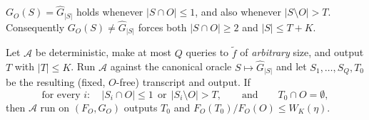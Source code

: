 \begin{lemma}
\label{lem:f3-window}
$G_O(S)=\hat G_{|S|}$ holds whenever $|S\cap O|\le1$, and also whenever
$|S\setminus O|>T$.  Consequently $G_O(S)\neq\hat G_{|S|}$ forces both
$|S\cap O|\ge2$ and $|S|\le T+K$.
\end{lemma}
%

\begin{lemma}\label{lem:f3-val}
Let $\mathcal A$ be deterministic, make at most $Q$ queries to $\tilde f$ of
\emph{arbitrary} size, and output $T$ with $|T|\le K$.  Run $\mathcal A$ against
the canonical oracle $S\mapsto\hat G_{|S|}$ and let $S_1,\dots,S_Q,T_0$ be the
resulting (fixed, $O$-free) transcript and output.  If
\[
  \text{for every }i:\quad |S_i\cap O|\le1\ \ \text{or}\ \ |S_i\setminus O|>T,
  \qquad\text{and}\qquad T_0\cap O=\emptyset ,
\]
then $\mathcal A$ run on $(F_O,G_O)$ outputs $T_0$ and
$F_O(T_0)/F_O(O)\le W_K(\eta)$.
\end{lemma}

